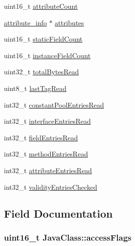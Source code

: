\begin{DoxyCompactItemize}
\item 
uint16\+\_\+t \hyperlink{structJavaClass_ad04e4bd9744078e4f1f739f51295480e}{attribute\+Count}
\item 
\hyperlink{structattribute__info}{attribute\+\_\+info} $\ast$ \hyperlink{structJavaClass_ae90496c9f9b340ef216b24359cb2ff63}{attributes}
\item 
uint16\+\_\+t \hyperlink{structJavaClass_a8b68d0b90dc8af53c6417299b05de8fa}{static\+Field\+Count}
\item 
uint16\+\_\+t \hyperlink{structJavaClass_a5233749f35d2fa0853123ed3ac7ff0c8}{instance\+Field\+Count}
\item 
uint32\+\_\+t \hyperlink{structJavaClass_a58b471dbb758d2a3c1bbd6e0e90fb6e2}{total\+Bytes\+Read}
\item 
uint8\+\_\+t \hyperlink{structJavaClass_a57b0443668351c7380e3d8cdb3e97d7d}{last\+Tag\+Read}
\item 
int32\+\_\+t \hyperlink{structJavaClass_a7e50281e01408da883645af7d983570c}{constant\+Pool\+Entries\+Read}
\item 
int32\+\_\+t \hyperlink{structJavaClass_a4638a5373f392eaaf80048856cb39033}{interface\+Entries\+Read}
\item 
int32\+\_\+t \hyperlink{structJavaClass_a1d9b1e10d762f2153926f46b83180c23}{field\+Entries\+Read}
\item 
int32\+\_\+t \hyperlink{structJavaClass_a5369bcdeb6b25d30dc02df99bf0f0656}{method\+Entries\+Read}
\item 
int32\+\_\+t \hyperlink{structJavaClass_aefcb0a0fbf6d98692680922792d74401}{attribute\+Entries\+Read}
\item 
int32\+\_\+t \hyperlink{structJavaClass_a60729716eb3da22f5517b877343be076}{validity\+Entries\+Checked}
\end{DoxyCompactItemize}


\subsection{Field Documentation}
\subsubsection[{\texorpdfstring{access\+Flags}{accessFlags}}]{\setlength{\rightskip}{0pt plus 5cm}uint16\+\_\+t Java\+Class\+::access\+Flags}\hypertarget{structJavaClass_a305af686b39aafe8248cb4b5af0f5ad4}{}\label{structJavaClass_a305af686b39aafe8248cb4b5af0f5ad4}
